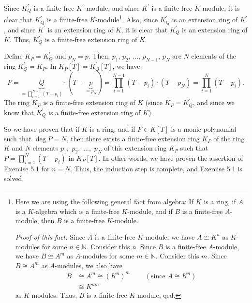\documentclass[numbers=enddot,12pt,final,onecolumn,notitlepage]{scrartcl}%
\begin{document}
Since $K_{Q}^{\prime}$ is a finite-free $K^{\prime}$-module, and since
$K^{\prime}$ is a finite-free $K$-module, it is clear that $K_{Q}^{\prime}$ is
a finite-free $K$-module\footnote{Here we are using the following general fact
from algebra: If $K$ is a ring, if $A$ is a $K$-algebra which is a finite-free
$K$-module, and if $B$ is a finite-free $A$-module, then $B$ is a finite-free
$K$-module.
\par
\textit{Proof of this fact.} Since $A$ is a finite-free $K$-module, we have
$A\cong K^{n}$ as $K$-modules for some $n\in\mathbb{N}$. Consider this $n$.
Since $B$ is a finite-free $A$-module, we have $B\cong A^{m}$ as $A$-modules
for some $m\in\mathbb{N}$. Consider this $m$. Since $B\cong A^{m}$ as
$A$-modules, we also have%
\begin{align*}
B  &  \cong A^{m}\cong\left(  K^{n}\right)  ^{m}\ \ \ \ \ \ \ \ \ \ \left(
\text{since }A\cong K^{n}\right) \\
&  \cong K^{nm}%
\end{align*}
as $K$-modules. Thus, $B$ is a finite-free $K$-module, qed.}. Also, since
$K_{Q}^{\prime}$ is an extension ring of $K^{\prime}$, and since $K^{\prime}$
is an extension ring of $K$, it is clear that $K_{Q}^{\prime}$ is an extension
ring of $K$. Thus, $K_{Q}^{\prime}$ is a finite-free extension ring of $K$.

Define $K_{P}=K_{Q}^{\prime}$ and $p_{N}=p$. Then, $p_{1}$, $p_{2}$, $...$,
$p_{N-1}$, $p_{N}$ are $N$ elements of the ring $K_{Q}^{\prime}=K_{P}$. In
$K_{P}\left[  T\right]  =K_{Q}^{\prime}\left[  T\right]  $, we have%
\[
P=\underbrace{Q}_{=\prod\limits_{i=1}^{N-1}\left(  T-p_{i}\right)  }%
\cdot\left(  T-\underbrace{p}_{=p_{N}}\right)  =\prod\limits_{i=1}%
^{N-1}\left(  T-p_{i}\right)  \cdot\left(  T-p_{N}\right)  =\prod
\limits_{i=1}^{N}\left(  T-p_{i}\right)  .
\]
The ring $K_{P}$ is a finite-free extension ring of $K$ (since $K_{P}%
=K_{Q}^{\prime}$, and since we know that $K_{Q}^{\prime}$ is a finite-free
extension ring of $K$).

So we have proven that if $K$ is a ring, and if $P\in K\left[  T\right]  $ is
a monic polynomial such that $\deg P=N$, then there exists a finite-free
extension ring $K_{P}$ of the ring $K$ and $N$ elements $p_{1},$ $p_{2},$
$...,$ $p_{N}$ of this extension ring $K_{P}$ such that $P=\prod
\limits_{i=1}^{N}\left(  T-p_{i}\right)  $ in $K_{P}\left[  T\right]  $. In
other words, we have proven the assertion of Exercise 5.1 for $n=N$. Thus, the
induction step is complete, and Exercise 5.1 is solved.
\end{document}
